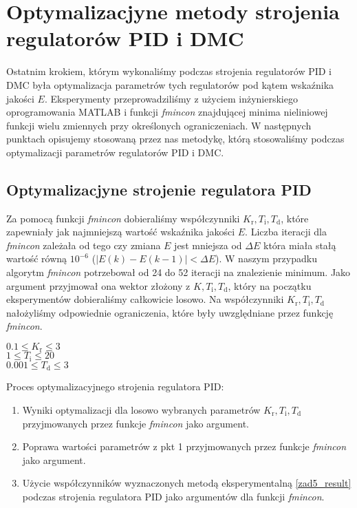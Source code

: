 \chapter{Optymalizacjyne metody strojenia regulatorów PID i DMC}
\label{zad6}
Ostatnim krokiem, którym wykonaliśmy podczas strojenia regulatorów PID i DMC była optymalizacja parametrów tych regulatorów pod kątem wskaźnika jakości $E$. Eksperymenty przeprowadziliśmy z użyciem inżynierskiego oprogramowania MATLAB i funkcji \textit{fmincon} znajdującej minima nieliniowej funkcji wielu zmiennych przy określonych ograniczeniach. W następnych punktach opisujemy stosowaną przez nas metodykę, którą stosowaliśmy podczas optymalizacji parametrów regulatorów PID i DMC.
\section{Optymalizacjyne strojenie regulatora PID}
\label{zad6_pid}
Za pomocą funkcji \textit{fmincon} dobieraliśmy współczynniki $K_{\mathrm{r}}, T_{\mathrm{i}}, T_{\mathrm{d}}$, które zapewniały jak najmniejszą wartość wskaźnika jakości $E$. Liczba iteracji dla \textit{fmincon} zależała od tego czy zmiana $E$ jest mniejsza od $\Delta E$ która miała stałą wartość równą $10^{\num{-6}}$ ($|E(k) - E(k-1)| < \Delta E$). W naszym przypadku algorytm \textit{fmincon} potrzebował od 24 do 52 iteracji na znalezienie minimum. Jako argument przyjmował ona wektor złożony z $K, T_{\mathrm{i}}, T_{\mathrm{d}}$, który na początku eksperymentów dobieraliśmy całkowicie losowo. Na współczynniki $K_{\mathrm{r}}, T_{\mathrm{i}}, T_{\mathrm{d}}$ nałożyliśmy odpowiednie ograniczenia, które były uwzględniane przez funkcję \textit{fmincon}.

\begin{center}
$\num{0,1} \leq K_{\mathrm{r}} \leq \num{3}$\\
$\num{1} \leq T_{\mathrm{i}} \leq \num{20}$\\
$\num{0,001} \leq T_{\mathrm{d}} \leq \num{3}$
\end{center}

Proces optymalizacyjnego strojenia regulatora PID:
\begin{center}
\begin{enumerate}
    \item Wyniki optymalizacji dla losowo wybranych parametrów $K_{\mathrm{r}}, T_{\mathrm{i}}, T_{\mathrm{d}}$ przyjmowanych przez funkcje \textit{fmincon} jako argument.
    \item Poprawa wartości parametrów z pkt 1 przyjmowanych przez funkcje \textit{fmincon} jako argument.
    \item Użycie współczynników wyznaczonych metodą eksperymentalną \ref{zad5_result} podczas strojenia regulatora PID  jako argumentów dla funkcji \textit{fmincon}. 
\end{enumerate}
\end{center}

